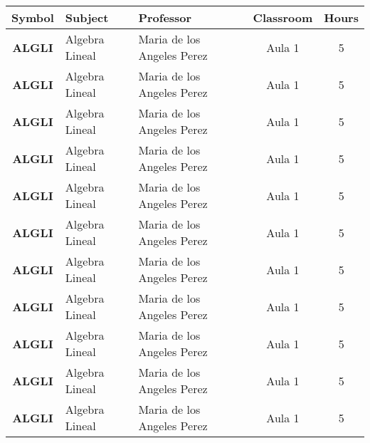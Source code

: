 \documentclass{article}
\begin{document}
            
\begin{longtable}{|c|p{4cm}|p{4cm}|c|c|}
\hline
\textbf{Symbol} & \textbf{Subject} & \textbf{Professor} & \textbf{Classroom} & \textbf{Hours} \\
\hline

\hline
\cellcolor[rgb]{0.41568627450980394,0.043137254901960784,0.011764705882352941} \textbf{ALGLI} & Algebra Lineal & Maria de los Angeles Perez & Aula 1 & 5  \\
\hline

\hline
\cellcolor[rgb]{0.8588235294117647,0.9921568627450981,0.7058823529411765} \textbf{ALGLI} & Algebra Lineal & Maria de los Angeles Perez & Aula 1 & 5  \\
\hline

\hline
\cellcolor[rgb]{0.9372549019607843,0.6039215686274509,0.5058823529411764} \textbf{ALGLI} & Algebra Lineal & Maria de los Angeles Perez & Aula 1 & 5  \\
\hline

\hline
\cellcolor[rgb]{0.1450980392156863,0.596078431372549,0.11372549019607843} \textbf{ALGLI} & Algebra Lineal & Maria de los Angeles Perez & Aula 1 & 5  \\
\hline

\hline
\cellcolor[rgb]{0.16470588235294117,0.6627450980392157,0.6745098039215687} \textbf{ALGLI} & Algebra Lineal & Maria de los Angeles Perez & Aula 1 & 5  \\
\hline

\hline
\cellcolor[rgb]{0.21176470588235294,0.5019607843137255,0.5843137254901961} \textbf{ALGLI} & Algebra Lineal & Maria de los Angeles Perez & Aula 1 & 5  \\
\hline

\hline
\cellcolor[rgb]{0.28627450980392155,0.25098039215686274,0.4666666666666667} \textbf{ALGLI} & Algebra Lineal & Maria de los Angeles Perez & Aula 1 & 5  \\
\hline

\hline
\cellcolor[rgb]{0.8156862745098039,0.6549019607843137,0.9019607843137255} \textbf{ALGLI} & Algebra Lineal & Maria de los Angeles Perez & Aula 1 & 5  \\
\hline

\hline
\cellcolor[rgb]{0.03137254901960784,0.5372549019607843,0.21568627450980393} \textbf{ALGLI} & Algebra Lineal & Maria de los Angeles Perez & Aula 1 & 5  \\
\hline

\hline
\cellcolor[rgb]{0.11372549019607843,0.34509803921568627,0.44313725490196076} \textbf{ALGLI} & Algebra Lineal & Maria de los Angeles Perez & Aula 1 & 5  \\
\hline

\hline
\cellcolor[rgb]{0.5372549019607843,0.996078431372549,0.29411764705882354} \textbf{ALGLI} & Algebra Lineal & Maria de los Angeles Perez & Aula 1 & 5  \\
\hline
\end{longtable}
            
\end{document}
